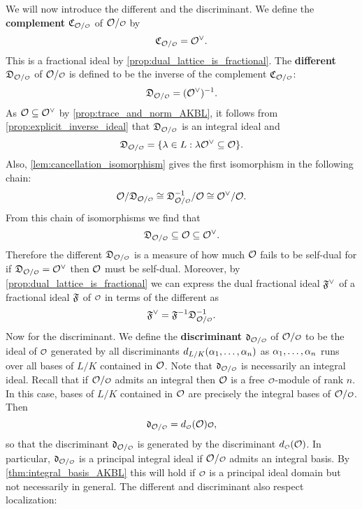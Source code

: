     We will now introduce the different and the discriminant. We define the \textbf{complement} $\mf{C}_{\mc{O}/\smc{O}}$ of $\mc{O}/\smc{O}$ by
    \[
      \mf{C}_{\mc{O}/\smc{O}} = \mc{O}^{\vee}.  
    \]
    This is a fractional ideal by \cref{prop:dual_lattice_is_fractional}. The \textbf{different} $\mf{D}_{\mc{O}/\smc{O}}$ of $\mc{O}/\smc{O}$ is defined to be the inverse of the complement $\mf{C}_{\mc{O}/\smc{O}}$:
    \[
      \mf{D}_{\mc{O}/\smc{O}} = (\mc{O}^{\vee})^{-1}.  
    \]
    As $\mathcal{O} \subseteq \mathcal{O}^{\vee}$ by \cref{prop:trace_and_norm_AKBL}, it follows from \cref{prop:explicit_inverse_ideal} that $\mf{D}_{\mc{O}/\smc{O}}$ is an integral ideal and
    \[
      \mf{D}_{\mc{O}/\smc{O}} = \{\l \in L: \l\mc{O}^{\vee} \subseteq \mc{O}\}.  
    \]
    Also, \cref{lem:cancellation_isomorphism} gives the first isomorphism in the following chain:
    \begin{equation}\label{equ:different_isomorphism_chain}
      \mc{O}/\mf{D}_{\mc{O}/\smc{O}} \cong \mf{D}_{\mc{O}/\smc{O}}^{-1}/\mc{O} \cong \mc{O}^{\vee}/\mc{O}.
    \end{equation}
    From this chain of isomorphisms we find that
    \[
      \mf{D}_{\mc{O}/\smc{O}} \subseteq \mc{O} \subseteq \mc{O}^{\vee}.
    \]
    Therefore the different $\mf{D}_{\mc{O}/\smc{O}}$ is a measure of how much $\mathcal{O}$ fails to be self-dual for if $\mf{D}_{\mc{O}/\smc{O}} = \mc{O}^{\vee}$ then $\mathcal{O}$ must be self-dual. Moreover, by \cref{prop:dual_lattice_is_fractional} we can express the dual fractional ideal $\mathfrak{F}^{\vee}$ of a fractional ideal $\mathfrak{F}$ of $\smc{O}$ in terms of the different as
    \[
      \mf{F}^{\vee} = \mf{F}^{-1}\mf{D}_{\mc{O}/\smc{O}}^{-1}.
    \]
    Now for the discriminant. We define the \textbf{discriminant} $\mf{d}_{\mc{O}/\smc{O}}$ of $\mc{O}/\smc{O}$ to be the ideal of $\smc{O}$ generated by all discriminants $d_{L/K}(\alpha_{1},\ldots,\alpha_{n})$ as $\alpha_{1},\ldots,\alpha_{n}$ runs over all bases of $L/K$ contained in $\mathcal{O}$. Note that $\mf{d}_{\mc{O}/\smc{O}}$ is necessarily an integral ideal. Recall that if $\mc{O}/\smc{O}$ admits an integral then $\mathcal{O}$ is a free $\smc{O}$-module of rank $n$. In this case, bases of $L/K$ contained in $\mathcal{O}$ are precisely the integral bases of $\mc{O}/\smc{O}$. Then
    \[
      \mf{d}_{\mc{O}/\smc{O}} = d_{\smc{O}}(\mc{O})\smc{O},
    \]
    so that the discriminant $\mf{d}_{\mc{O}/\smc{O}}$ is generated by the discriminant $d_{\smc{O}}(\mc{O})$. In particular, $\mf{d}_{\mc{O}/\smc{O}}$ is a principal integral ideal if $\mc{O}/\smc{O}$ admits an integral basis. By \cref{thm:integral_basis_AKBL} this will hold if $\smc{O}$ is a principal ideal domain but not necessarily in general. The different and discriminant also respect localization:

